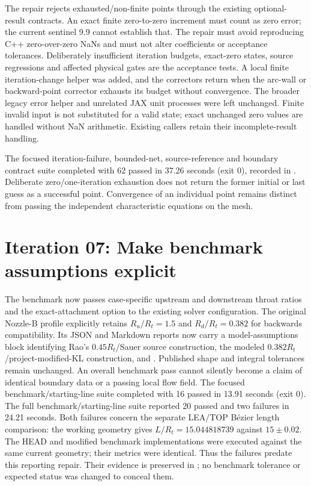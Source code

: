 The repair rejects exhausted/non-finite points through the existing
optional-result contracts. An exact finite zero-to-zero increment must count
as zero error; the current sentinel 9.9 cannot establish that. The repair
must avoid reproducing C++ zero-over-zero NaNs and must not alter coefficients
or acceptance tolerances. Deliberately insufficient iteration budgets,
exact-zero states, source regressions and affected physical gates are the
acceptance tests. A local finite iteration-change helper was added, and
the correctors return  when the arc-wall or backward-point corrector exhausts
its budget without convergence. The broader legacy error helper and
unrelated JAX unit processes were left unchanged. Finite invalid input is
not substituted for a valid state; exact unchanged zero values are handled
without NaN arithmetic. Existing callers retain their incomplete-result
handling.

The focused iteration-failure, bounded-net, source-reference and boundary
contract suite completed with 62 passed in 37.26 seconds (exit 0), recorded
in . Deliberate zero/one-iteration exhaustion
does not return the former initial or last guess as a successful point.
Convergence of an individual point remains distinct from passing the
independent characteristic equations on the mesh.

\section{Iteration 07: Make benchmark assumptions explicit}
The benchmark now passes case-specific upstream and downstream throat
ratios and the exact-attachment option to the existing solver configuration.
The original Nozzle-B profile explicitly retains $R_u/R_t=1.5$ and
$R_d/R_t=0.382$ for backwards compatibility. Its JSON and Markdown reports
now carry a model-assumptions block identifying Rao's $0.45R_t$/Sauer source
construction, the modeled $0.382R_t$/project-modified-KL construction, and
. Published shape and integral
tolerances remain unchanged. An overall benchmark pass cannot silently
become a claim of identical boundary data or a passing local flow field.
The focused benchmark/starting-line suite completed with 16 passed in
13.91 seconds (exit 0). The full
benchmark/starting-line suite reported 20 passed and two failures in
24.21 seconds. Both failures concern the separate LEA/TOP B\'ezier length
comparison: the working geometry gives $L/R_t=15.044818739$ against
$15\pm0.02$. The HEAD and modified benchmark implementations were executed
against the same current geometry; their metrics were identical. Thus the
failures predate this reporting repair. Their evidence is preserved in
; no benchmark tolerance or
expected status was changed to conceal them.

